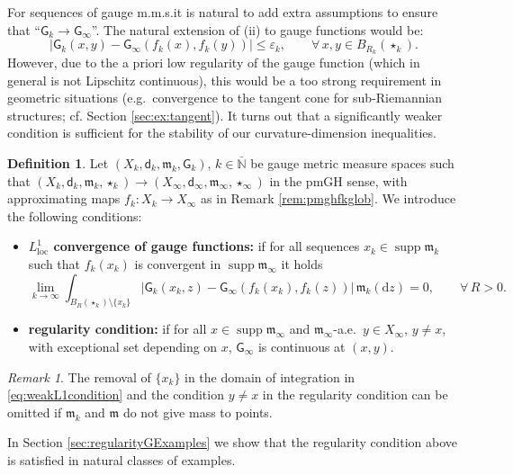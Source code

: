 \documentclass[11pt,a4paper]{article}
\theoremstyle{plain}
\theoremstyle{definition}
\newtheorem{definition}[theorem]{Definition}
\theoremstyle{remark}
\newtheorem{remark}[theorem]{Remark}
\numberwithin{equation}{section}
\newcommand{\N}{\mathbb{N}} %
\DeclareMathOperator{\supp}{\mathrm{supp}}
\newcommand{\loc}{\mathrm{loc}}
\newcommand{\di}{\mathrm{d}}
\newcommand{\mm}{\mathfrak m}
\newcommand{\sfd}{\mathsf d}
\newcommand{\sfG}{\mathsf G}
\begin{document}
For sequences of gauge m.m.s.\@ it is natural to add extra assumptions to ensure that ``$\sfG_k \to \sfG_\infty$''. The natural extension of (ii) to gauge functions would be:
\begin{equation}\label{eq:iiforgauge}
|\sfG_k(x,y) - \sfG_\infty(f_k(x),f_k(y))|\leq \varepsilon_{k}, \qquad \forall \, x,y\in B_{R_k}(\star_k).
\end{equation}
However, due to the a priori low regularity of the gauge function (which in general is not Lipschitz continuous), this would be a too strong requirement in geometric situations (e.g.\ convergence to the tangent cone for sub-Riemannian structures; cf. Section \ref{sec:ex:tangent}).  It turns out that a significantly weaker condition is sufficient for the stability of our curvature-dimension inequalities.

\begin{definition}\label{def:weakL1andregularity}
Let $(X_k, \sfd_k,\mm_k,\sfG_k)$, $k\in \bar{\N}$ be gauge metric measure spaces such that $(X_k, \sfd_k,\mm_k,\star_k) \to (X_\infty,\sfd_\infty,\mm_\infty,\star_\infty)$ in the pmGH sense, with approximating maps $f_k:X_k \to X_\infty$ as in  Remark \ref{rem:pmghfkglob}. We introduce the following conditions:
\begin{itemize}
\item \textbf{$L^1_{\loc}$ convergence of gauge functions:} if for all sequences $x_k\in \supp\mm_k$ such that $f_k(x_k)$ is convergent in $\supp\mm_\infty$  it holds
\begin{equation}\label{eq:weakL1condition}
\lim_{k\to \infty}\int_{B_{R}(\star_k){\setminus \{x_k\}}}|\sfG_k(x_k,z)-\sfG_\infty(f_k(x_k),f_k(z))| \, \mm_k(\di z) =0 ,  \qquad \forall\, R>0.
\end{equation}
\item \textbf{regularity condition:} if for all $x\in \supp\mm_\infty$ and $\mm_\infty$-a.e.\ $y\in X_\infty$, $y\neq x$, with exceptional set depending on $x$, $\sfG_\infty$ is continuous at $(x,y)$.
\end{itemize}
\end{definition}
\begin{remark}
The removal of $\{x_k\}$ in the domain of integration in \eqref{eq:weakL1condition} and the condition $y\neq x$ in the regularity condition can be omitted if $\mm_k$ and $\mm$ do not give mass to points.
\end{remark}
In Section \ref{sec:regularityGExamples} we show that the regularity condition above is satisfied in natural classes of examples.
\end{document}
